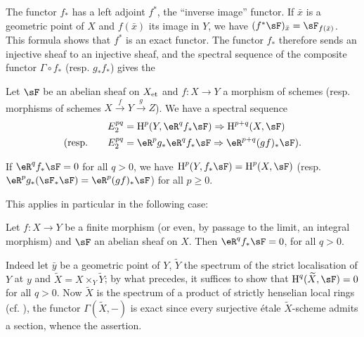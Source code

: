 The functor $f_*$ has a left adjoint $f^*$, the ``inverse image'' functor.
If $\bar x$ is a geometric point of $X$ and $f(\bar x)$ its
image in $Y$, we have $(f^* \sF)_{\bar x} = \sF_{f(\bar x)}$. This formula shows
that $f^*$ is an exact functor. The functor $f_*$ therefore sends an injective
sheaf to an injective sheaf, and the spectral sequence of the composite functor
$\Gamma\circ f_*$ (resp. $g_* f_*$) gives the 





\begin{theorem}\label{I:2-3-4}
Let $\sF$ be an abelian sheaf on ${X}_{\textnormal{et}}$ and $f:X\to Y$ a morphism of
schemes (resp. morphisms of schemes $X\xrightarrow f Y \xrightarrow g Z$).
We have a spectral sequence 
\begin{align*}
  E_2^{pq} &= \h^p(Y,\eR^q f_* \sF) \Rightarrow \h^{p+q}(X,\sF) \\
  \text{(resp.}\qquad E_2^{pq} &= \eR^p g_* \eR^q f_* \sF \Rightarrow \eR^{p+q}(gf)_* \sF\text{).}
\end{align*}
\end{theorem}





\begin{corollary}\label{I:2-3-5}
If $\eR^q f_* \sF=0$ for all $q>0$, we have $\h^p(Y,f_* \sF)=\h^p(X,\sF)$ (resp.
$\eR^p g_*(\sF_* \sF) = \eR^p(g f)_* \sF$) for all $p\geqslant 0$.
\end{corollary}

This applies in particular in the following case:





\begin{proposition}\label{I:2-3-6}
Let $f:X\to Y$ be a finite morphism (or even, by passage to the limit, an
integral morphism) and $\sF$ an abelian sheaf on $X$. Then $\eR^q f_* \sF=0$,
for all $q>0$.
\end{proposition}

Indeed let $\bar y$ be a geometric point of $Y$, $\widetilde Y$ the
spectrum of the strict localisation of $Y$ at $y$ and
$\widetilde X=X\times_Y \widetilde Y$; by what precedes, it suffices to
show that $\h^q(\widetilde X,\sF) = 0$ for all $q>0$. Now $\widetilde X$ is the
spectrum of a product of strictly henselian local rings (cf.
\cite[I]{ra70}), the functor $\Gamma(\widetilde X,-)$ is exact since every
surjective \'etale $\widetilde X$-scheme admits a section, whence the assertion. 










